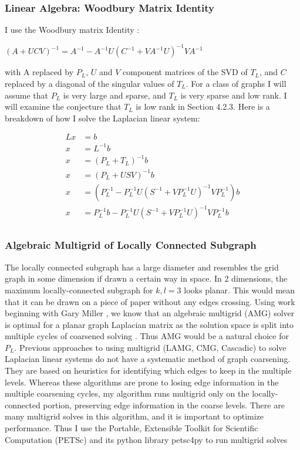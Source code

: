 \documentclass{article}
\begin{document}
\subsubsection{Linear Algebra: Woodbury Matrix Identity}
I use the Woodbury matrix Identity \cite{Woodbury:1950}:\\
\begin{spacing}{1}

\begin{center}
$(A+UCV)^{-1} = A^{-1} - A^{-1}U(C^{-1}+VA^{-1}U)^{-1}VA^{-1}$\\
\end{center}
\end{spacing}
with A replaced by $P_L$, $U$ and $V$ component matrices of the SVD of $T_L$, and $C$ replaced by a diagonal of the singular values of $T_L$. For a class of graphs I will assume that $P_L$ is very large and sparse, and $T_L$ is very sparse and low rank. I will examine the conjecture that $T_L$ is
low rank in Section 4.2.3. Here is a breakdown of how I solve the Laplacian linear system:

\begin{spacing}{1}
\begin{align*}
Lx & = b\\
x & = L^{-1}b\\
x & = (P_L+T_L)^{-1}b\\
x & = (P_L+USV)^{-1}b\\
x & = (P_L^{-1}-P_L^{-1}U(S^{-1}+VP_L^{-1}U)^{-1}VP_L^{-1})b\\
x & = P_L^{-1}b-P_L^{-1}U(S^{-1}+VP_L^{-1}U)^{-1}VP_L^{-1}b\\
\end{align*}
\end{spacing}


\subsubsection{Algebraic Multigrid of Locally Connected Subgraph}
The locally connected subgraph has a large diameter and resembles the grid graph in some dimension if drawn a certain way in space. In 2 dimensions, the maximum locally-connected subgraph for $k,l=3$ looks planar. This would mean that it can be drawn on a piece of paper without any edges crossing. Using work beginning with Gary Miller \cite{Miller:1995}, we know that an algebraic multigrid (AMG) solver is optimal for a planar graph Laplacian matrix as the solution space is split into multiple cycles of coarsened solving \cite{Brandt:1984}. Thus AMG would be a natural choice for $P_L$. Previous approaches to using multigrid (LAMG, CMG, Cascadic) to solve Laplacian linear systems do not have a systematic method of graph coarsening. They are based on heuristics for identifying which edges to keep in the multiple levels. Whereas these algorithms are prone to losing edge information in the multiple coarsening cycles, my algorithm runs multigrid only on the locally-connected portion, preserving edge information in the coarse levels. There are many multigrid solves in this algorithm, and it is important to optimize performance. Thus I use the Portable, Extensible Toolkit for Scientific Computation (PETSc) and its python library petsc4py to run multigrid solves \cite{petsc-user-ref, Dalcin:2011}
\end{document}
